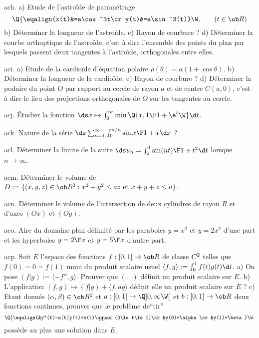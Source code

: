 \exo [Level=2,Fight=2,Learn=1,Field=\RepèreDeFrenet,Type=\Exercices,Origin=\MP] ach. 
a) Etude de l'astro\"ide de paramétrage
$$
\Q\{\eqalign{x(t)&=a\cos^3t\cr y(t)&=a\sin^3(t)}\W.\qquad(t\in\ob R)
$$
b) Déterminer la longueur de l'astroïde. \pn 
c) Rayon de courbure ? \pn
d) Déterminer la courbe orthoptique de l'astro\" ide, c'est à dire l'ensemble des points du plan 
par lesquels passent deux tangentes à l'astroïde, orthogonales entre elles. 

\exo [Level=2,Fight=2,Learn=1,Field=\RepèreDeFrenet,Type=\Exercices,Origin=\MP] aci. 
a) Etude de la cardioïde d'équation polaire $\rho(\theta)=a(1+\cos\theta)$. \pn
b) Déterminer la longueur de la cardioïde. \pn
c) Rayon de courbure ?\pn
d) Déterminer la podaire du point $O$ par rapport au cercle de rayon $a$ et de centre $C(a,0)$, 
c'est à dire le lieu des projections orthogonales de $O$ sur les tangentes au cercle. 

\exo [Level=2,Fight=1,Learn=1,Field=\FonctionsDéfiniesParUneIntégrale,Type=\Exercices,Origin=] acj. 
Étudier la fonction $\ds x\mapsto \int_0^\infty\min\Q\{x,{1\F1+\e^t}\W\}\d t$. 

\exo [Level=2,Fight=2,Learn=1,Field=\Séries,Type=\Exercices,Origin=] ack. 
Nature de la série $\ds\sum_{n=1}^\infty\int_0^{\pi/n}{\sin x\F1+x}\d x$ ?

\exo [Level=2,Fight=2,Learn=1,Field=\FonctionsDéfiniesParUneIntégrale,Type=\Exercices,Origin=] acl. 
Déterminer la limite de la suite $\ds u_n=\int_0^1{\sin (n t)\F 1+t^2}\d t$ lorsque $n\to\infty$. 

\exo [Level=2,Fight=1,Learn=1,Field=\Volumes,Type=\Exercices,Origin=] acm. 
Déterminer le volume de $D:=\{(x,y,z)\in\ob R^3:x^2+y^2\le az\hbox{ et }x+y+z\le a\}$. 

\exo [Level=2,Fight=1,Learn=1,Field=\Volumes,Type=\Exercices,Origin=] acn. 
Déterminer le volume de l'intersection de deux cylindres de rayon $R$ 
et d'axes $(Ox)$ et $(Oy)$. 

\exo [Level=2,Fight=1,Learn=1,Field=\Aires,Type=\Exercices,Origin=] aco. 
Aire du domaine plan délimité par les paraboles $y=x^2$ et $y=2x^2$ d'une part 
et les hyperboles $y={2\F x}$ et $y={5\F x}$ d'autre part. 

\exo [Level=1,Fight=2,Learn=1,Field=\EspacesPréHilbertiens,Type=\Exercices,Origin=] acp. 
Soit $E$ l'espace des fonctions $f:[0,1]\to \ob R$ de classe $\sc C^2$ telles que $f(0)=0=f(1)$ muni du produit scalaire usuel 
$\langle f,g\rangle:=\int_0^1f(t)g(t)\d t$. \pn
a) On pose $(f|g):=\langle-f'',g\rangle$. Prouver que $(.|.)$ définit un produit scalaire sur $E$.  \pn
b) L'application $(f,g)\mapsto(f|g)+\langle f,ag\rangle$ définit elle un produit scalaire sur $E$ ?\pn
c) Etant donnés $(\alpha,\beta)\in\ob R^2$ et $a:[0,1]\to\Q]0,\infty\W[$ et $b:[0,1]\to\ob R$ 
deux fonctions continues, prouver que le problème de``tir''
$$
\Q\{\eqalign{&y''(t)-a(t)y(t)=b(t)\qquad(0\le t\le 1)\cr&y(0)=\alpha\cr&y(1)=\beta}
\W.
$$
possède au plus une solution dans $E$. 

